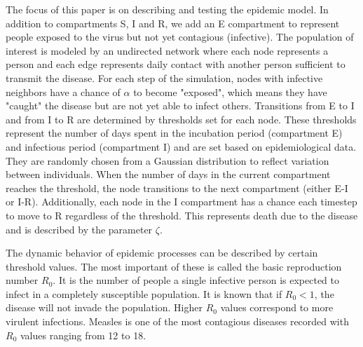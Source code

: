 \documentclass[conference]{IEEEtran}
\begin{document}
The focus of this paper is on describing and testing the epidemic model. In addition to compartments S, I and R, we add an E compartment to represent people exposed to the virus but not yet contagious (infective). The population of interest is modeled by an undirected network where each node represents a person and each edge represents daily contact with another person sufficient to transmit the disease. For each step of the simulation, nodes with infective neighbors have a chance of $\alpha$ to become "exposed", which means they have "caught" the disease but are not yet able to infect others. Transitions from E to I and from I to R are determined by thresholds set for each node. These thresholds represent the number of days spent in the incubation period (compartment E) and infectious period (compartment I) and are set based on epidemiological data. They are randomly chosen from a Gaussian distribution to reflect variation between individuals. When the number of days in the current compartment reaches the threshold, the node transitions to the next compartment (either E-I or I-R). Additionally, each node in the I compartment has a chance each timestep to move to R regardless of the threshold. This represents death due to the disease and is described by the parameter $\zeta$.

The dynamic behavior of epidemic processes can be described by certain threshold values. The most important of these is called the basic reproduction number $R_0$. It is the number of people a single infective person is expected to infect in a completely susceptible population. It is known that if $R_0 < 1$, the disease will not invade the population.\cite{Hethcote2000TheMO} Higher $R_0$ values correspond to more virulent infections. Measles is one of the most contagious diseases recorded with $R_0$ values ranging from 12 to 18.\cite{pinkbookMeasles}
\end{document}
